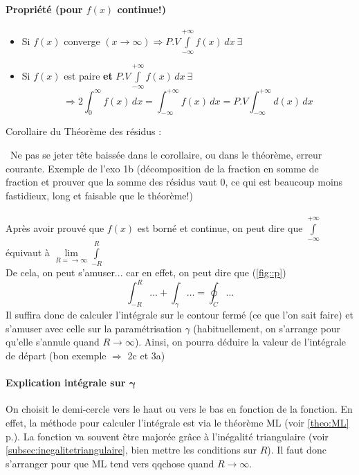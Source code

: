  \paragraph{Propriété (pour $f(x)$ continue!)} \begin{itemize}
 \item Si $f(x)$ converge $(x\rightarrow\infty)\Rightarrow P.V\displaystyle\int\limits_{-\infty}^{+\infty}f(x)\,dx\ \exists$
 \item Si $f(x)$ est paire \textbf{et} $P.V\displaystyle\int\limits_{-\infty}^{+\infty}f(x)\,dx\ \exists$ $$\Rightarrow 2\int_0^{\infty}f(x)\,dx=\int_{-\infty}^{+\infty}f(x)\,dx=P.V\int_{-\infty}^{+\infty}d(x)\,dx$$
 \end{itemize}
Corollaire du Théorème des résidus : \begin{center}
      \end{center}
\danger\ Ne pas se jeter tête baissée dans le corollaire, ou dans le théorème, erreur courante. Exemple de l'exo 1b (décomposition de la fraction en somme de fraction et prouver que la somme des résidus vaut 0, ce qui est beaucoup moins fastidieux, long et faisable que le théorème!)\\\\ 

Après avoir prouvé que $f(x)$ est borné et continue, on peut dire que $\displaystyle\int\limits_{-\infty}^{+\infty}$ équivaut à $\lim\limits_{R=\rightarrow\infty}\displaystyle\int\limits_{-R}^R$\\ 
De cela, on peut s'amuser... car en effet, on peut dire que (\autoref{fig::p}) $$\int_{-R}^R\dots+\int_{\gamma}\dots=\oint_C\dots$$ Il suffira donc de calculer l'intégrale sur le contour fermé (ce que l'on sait faire) et s'amuser avec celle sur la paramétrisation $\gamma$ (habituellement, on s'arrange pour qu'elle s'annule quand $R\rightarrow\infty$). Ainsi, on pourra déduire la valeur de l'intégrale de départ (bon exemple $\Rightarrow$ 2c et 3a)
\paragraph{Explication intégrale sur $\boldsymbol{\gamma}$}
On choisit le demi-cercle vers le haut ou vers le bas en fonction de la fonction. En effet, la méthode pour calculer l'intégrale est via le théorème ML (voir \autoref{theo:ML} p.\pageref{theo:ML}). La fonction va souvent être majorée grâce à l'inégalité triangulaire (voir \autoref{subsec:inegalitetriangulaire}, bien mettre les conditions sur $R$). Il faut donc s'arranger pour que ML tend vers qqchose quand $R\rightarrow\infty$.
